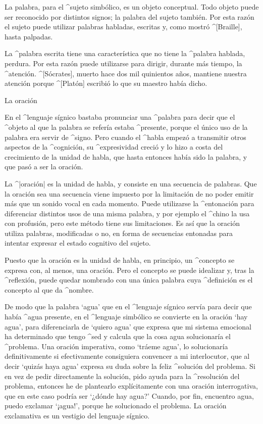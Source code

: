La palabra, para el ^{sujeto} simbólico, es un objeto conceptual. Todo
objeto puede ser reconocido por distintos signos; la palabra del sujeto
también. Por esta razón el sujeto puede utilizar palabras habladas,
escritas y, como mostró ^[Braille], hasta palpadas.

La ^{palabra escrita} tiene una característica que no tiene la ^{palabra
hablada}, perdura. Por esta razón puede utilizarse para dirigir, durante
más tiempo, la ^{atención}. ^[Sócrates], muerto hace dos mil quinientos
años, mantiene nuestra atención porque ^[Platón] escribió lo que su
maestro había dicho.


\Section La oración

En el ^{lenguaje sígnico} bastaba pronunciar una ^{palabra} para decir
que el ^{objeto} al que la palabra se refería estaba ^{presente}, porque
el único uso de la palabra era servir de ^{signo}. Pero cuando el
^{habla} empezó a transmitir otros aspectos de la ^{cognición}, su
^{expresividad} creció y lo hizo a costa del crecimiento de la unidad de
habla, que hasta entonces había sido la palabra, y que pasó a ser la
oración.

La ^|oración| es la unidad de habla, y consiste en una secuencia de
palabras. Que la oración sea una secuencia viene impuesto por la
limitación de no poder emitir más que un sonido vocal en cada momento.
Puede utilizarse la ^{entonación} para diferenciar distintos usos de una
misma palabra, y por ejemplo el ^{chino} la usa con profusión, pero este
método tiene sus limitaciones. Es así que la oración utiliza palabras,
modificadas o no, en forma de secuencias entonadas para intentar
expresar el estado cognitivo del sujeto.

Puesto que la oración es la unidad de habla, en principio, un
^{concepto} se expresa con, al menos, una oración. Pero el concepto se
puede idealizar y, tras la ^{reflexión}, puede quedar nombrado con una
única palabra cuya ^{definición} es el concepto al que da ^{nombre}.

De modo que la palabra `agua' que en el ^{lenguaje sígnico} servía para
decir que había ^{agua} presente, en el ^{lenguaje simbólico} se
convierte en la oración `hay agua', para diferenciarla de `quiero agua'
que expresa que mi sistema emocional ha determinado que tengo ^{sed} y
calcula que la cosa agua solucionaría el ^{problema}. Una oración
imperativa, como `tráeme agua', lo solucionaría definitivamente si
efectivamente consiguiera convencer a mi interlocutor, que al decir
`quizás haya agua' expresa su duda sobre la feliz ^{solución} del
problema. Si en vez de pedir directamente la solución, pido ayuda para
la ^{resolución} del problema, entonces he de plantearlo explícitamente
con una oración interrogativa, que en este caso podría ser `¿dónde hay
agua?' Cuando, por fin, encuentro agua, puedo exclamar `¡agua!', porque
he solucionado el problema. La oración exclamativa es un vestigio del
lenguaje sígnico.


